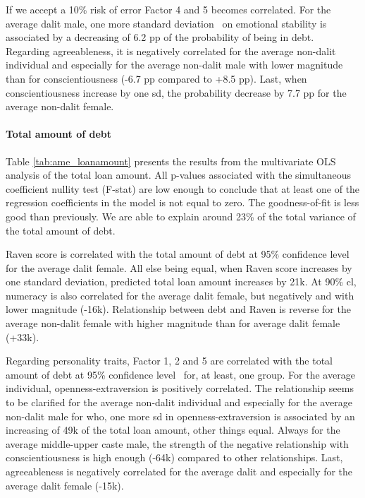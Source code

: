 \documentclass[a4paper, 12pt, onecolumn]{article}
\newcommand{\sd}{standard deviation}
\newcommand{\Aebe}{All else being equal}
\newcommand{\ote}{other things equal}
\newcommand{\cl}{confidence level}
\newcommand{\PTCS}{PT\&CS}
\begin{document}
If we accept a 10\% risk of error Factor 4 and 5 becomes correlated.
For the average dalit male, one more \sd~ on emotional stability is associated by a decreasing of 6.2 pp of the probability of being in debt.
Regarding agreeableness, it is negatively correlated for the average non-dalit individual and especially for the average non-dalit male with lower magnitude than for conscientiousness (-6.7 pp compared to +8.5 pp).
Last, when conscientiousness increase by one sd, the probability decrease by 7.7 pp for the average non-dalit female.



\paragraph{Total amount of debt}
Table \ref{tab:ame_loanamount} presents the results from the multivariate OLS analysis of the total loan amount.
All p-values associated with the simultaneous coefficient nullity test (F-stat) are low enough to conclude that at least one of the regression coefficients in the model is not equal to zero.
The goodness-of-fit is less good than previously.
We are able to explain around 23\% of the total variance of the total amount of debt.

Raven score is correlated with the total amount of debt at 95\% \cl~ for the average dalit female.
\Aebe, when Raven score increases by one \sd, predicted total loan amount increases by \rupee21k.
At 90\% cl, numeracy is also correlated for the average dalit female, but negatively and with lower magnitude (-\rupee16k).
Relationship between debt and Raven is reverse for the average non-dalit female with higher magnitude than for average dalit female (+\rupee33k).

Regarding personality traits, Factor 1, 2 and 5 are correlated with the total amount of debt at 95\% \cl~ for, at least, one group.
For the average individual, openness-extraversion is positively correlated.
The relationship seems to be clarified for the average non-dalit individual and especially for the average non-dalit male for who, one more sd in openness-extraversion is associated by an increasing of \rupee49k of the total loan amount, \ote.
Always for the average middle-upper caste male, the strength of the negative relationship with conscientiousness is high enough (-\rupee64k) compared to other relationships. 
Last, agreeableness is negatively correlated for the average dalit and especially for the average dalit female (-\rupee15k).
\end{document}
